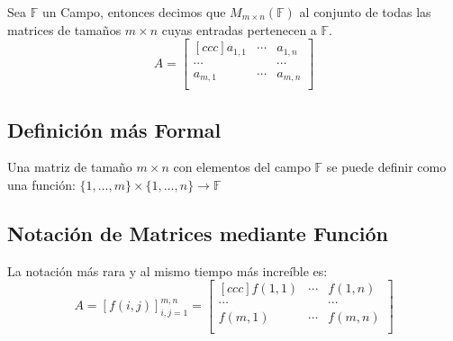 \documentclass[12pt, fleqn]{report}                             %
\begin{document}
            Sea $\mathbb{F}$ un Campo, entonces decimos que $M_{m \times n}(\mathbb{F})$
            al conjunto de todas las matrices de tamaños $m \times n$ cuyas entradas
            pertenecen a $\mathbb{F}$.
            \begin{equation}
                A = 
                \begin{bmatrix}[ccc]
                    a _{1, 1}   & \cdots & a_{1,n}   \\
                    \cdots      &        & \cdots    \\
                    a _{m, 1}   & \cdots & a_{m,n}   \\
                \end{bmatrix}
            \end{equation}


            \subsection*{Definición más Formal}
                Una matriz de tamaño $m \times n$ con elementos del campo $\mathbb{F}$ se puede
                definir como una función: 
                $\{1, \dots, m\} \times \{1, \dots , n\} \to \mathbb{F}$



            \subsection{Notación de Matrices mediante Función}

                La notación más rara y al mismo tiempo más increíble es:
                \begin{equation}
                    A   = [f(i,j)]_{i, j = 1}^{m, n}
                        =
                        \begin{bmatrix}[ccc]
                            f(1,1)  & \cdots & f(1,n)   \\
                            \cdots  &        & \cdots   \\
                            f(m, 1) & \cdots & f(m,n)   \\
                        \end{bmatrix}
                \end{equation}
\end{document}
